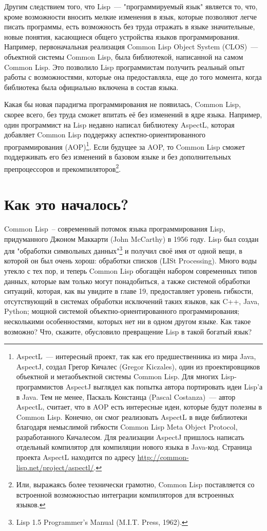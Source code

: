 Другим следствием того, что Lisp~--- "программируемый язык" является то, что, кроме
возможности вносить мелкие изменения в язык, которые позволяют легче писать программы,
есть возможность без труда отражать в языке значительные, новые понятия, касающиеся общего
устройства языков программирования. Например, первоначальная реализация Common Lisp Object
System (CLOS)~--- объектной системы Common Lisp, была библиотекой, написанной на самом
Common Lisp. Это позволило Lisp программистам получить реальный опыт работы с
возможностями, которые она предоставляла, еще до того момента, когда библиотека была
официально включена в состав языка.

Какая бы новая парадигма программирования не появилась, Common Lisp, скорее всего, без
труда сможет впитать её без изменений в ядре языка. Например, один программист на Lisp
недавно написал библиотеку AspectL, которая добавляет Common Lisp поддержку
аспектно-ориентированного программирования (AOP)\footnote{AspectL~--- интересный проект,
  так как его предшественника из мира Java, AspectJ, создал Грегор Кичалес (Gregor
  Kiczales), один из проектировщиков объектной и метаобъектной системы Common Lisp. Для
  многих Lisp-программистов AspectJ выглядел как попытка автора портировать идеи Lisp'а в
  Java. Тем не менее, Паскаль Констанца (Pascal Costanza)~--- автор AspectL, считает, что
  в AOP есть интересные идеи, которые будут полезны в Common Lisp. Конечно, он смог
  реализовать AspectL в виде библиотеки благодаря немыслимой гибкости Common Lisp Meta
  Object Protocol, разработанного Кичалесом. Для реализации AspectJ пришлось написать
  отдельный компилятор для компиляции нового языка в Java-код. Страница проекта AspectL
  находится по адресу \url{http://common-lisp.net/project/aspectl/}.}. Если будущее за
AOP, то Common Lisp сможет поддерживать его без изменений в базовом языке и без
дополнительных препроцессоров и прекомпиляторов\footnote{Или, выражаясь более технически
  грамотно, Common Lisp поставляется со встроенной возможностью интеграции компиляторов
  для встроенных языков.}.

\section{Как это началось?}

Common Lisp~-- современный потомок языка программирования Lisp, придуманного Джоном
Маккарти (John McCarthy) в 1956 году. Lisp был создан для "обработки символьных
данных"\footnote{Lisp 1.5 Programmer's Manual (M.I.T. Press, 1962).} и получил своё имя от
одной вещи, в которой он был очень хорош: обработки списков (LISt Processing). Много воды
утекло с тех пор, и теперь Common Lisp обогащён набором современных типов данных, которые
вам только могут понадобиться, а также системой обработки ситуаций, которая, как вы
увидите в главе 19, предоставляет уровень гибкости, отсутствующий в системах обработки
исключений таких языков, как C++, Java, Python; мощной системой объектно-ориентированного
программирования; несколькими особенностями, которых нет ни в одном другом языке. Как
такое возможно? Что, скажите, обусловило превращение Lisp в такой богатый язык?

